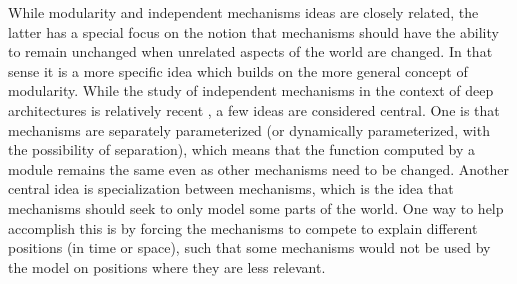 \documentclass{article}
\begin{document}
While modularity and independent mechanisms ideas are closely related, the latter has a special focus on the notion that mechanisms should have the ability to remain unchanged when unrelated aspects of the world are changed.  In that sense it is a more specific idea which builds on the more general concept of modularity.  While the study of independent mechanisms in the context of deep architectures is relatively recent \citep{goyal2019recurrent, mittal2020learning, goyal2020object}, a few ideas are considered central.  One is that mechanisms are separately parameterized (or dynamically parameterized, with the possibility of separation), which means that the function computed by a module remains the same even as other mechanisms need to be changed.  Another central idea is specialization between mechanisms, which is the idea that mechanisms should seek to only model some parts of the world.  One way to help accomplish this is by forcing the mechanisms to compete to explain different positions (in time or space), such that some mechanisms would not be used by the model on positions where they are less relevant.  

\end{document}
